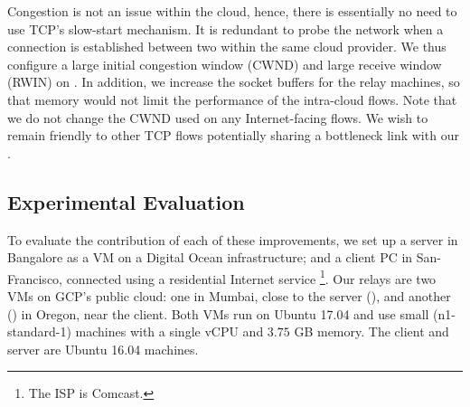 Congestion is not an issue within the cloud, hence, there is essentially no need to use TCP's slow-start mechanism. It is redundant to probe the network when a connection is established between two \proxies within the same cloud provider. We thus configure a large initial congestion window (CWND) and large receive window (RWIN) on \oursys \proxies. In addition, we increase the socket buffers for the relay machines, so that memory would not limit the performance of the intra-cloud flows.
Note that we do not change the CWND used on any Internet-facing flows. We wish to remain friendly to other TCP flows potentially sharing a bottleneck link with our \proxies. %







\subsection{Experimental Evaluation}\label{subsec:improving-baseline}
To evaluate the contribution of each of these improvements, we set up a server in Bangalore as a VM on a Digital Ocean infrastructure; and a client PC in San-Francisco, connected using a residential Internet service \footnote{The ISP is Comcast.}. Our relays are two VMs on GCP's public cloud: one in Mumbai, close to the server (\rs), and another (\rc)  in Oregon, near the client. Both VMs run on Ubuntu 17.04 and use small (n1-standard-1) machines with a single vCPU and $3.75$ GB memory. The client and server are Ubuntu 16.04 machines.

